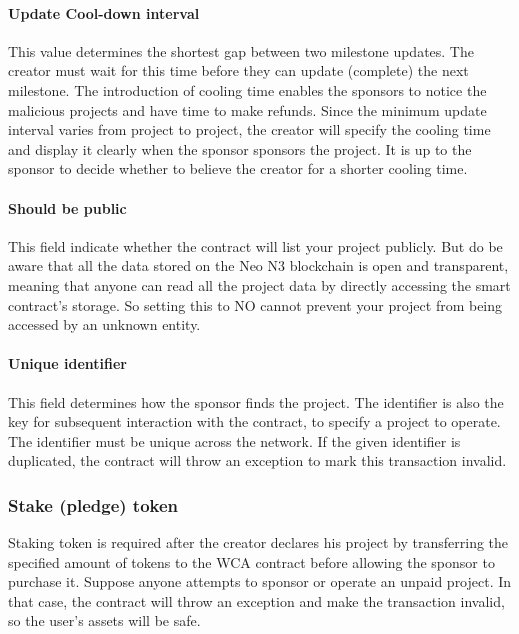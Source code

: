 \documentclass[12pt,a4paper]{article}
\begin{document}
    \paragraph{Update Cool-down interval}

    This value determines the shortest gap between two milestone updates.
    The creator must wait for this time before they can update (complete) the
    next milestone.
    The introduction of cooling time enables the sponsors to notice the malicious
    projects and have time to make refunds.
    Since the minimum update interval varies from project to project, the creator
    will specify the cooling time and display it clearly when the sponsor sponsors
    the project.
    It is up to the sponsor to decide whether to believe the creator for a shorter
    cooling time.

    \paragraph{Should be public}

    This field indicate whether the contract will list your project publicly.
    But do be aware that all the data stored on the Neo N3 blockchain is open
    and transparent, meaning that anyone can read all the project data by directly
    accessing the smart contract's storage.
    So setting this to NO cannot prevent your project from being accessed by an
    unknown entity.

    \paragraph{Unique identifier}

    This field determines how the sponsor finds the project.
    The identifier is also the key for subsequent interaction with the contract,
    to specify a project to operate.
    The identifier must be unique across the network.
    If the given identifier is duplicated, the contract will throw an exception
    to mark this transaction invalid.

    \subsubsection{Stake (pledge) token}

    Staking token is required after the creator declares his project by transferring
    the specified amount of tokens to the WCA contract before allowing the sponsor
    to purchase it.
    Suppose anyone attempts to sponsor or operate an unpaid project.
    In that case, the contract will throw an exception and make the transaction
    invalid, so the user's assets will be safe.
\end{document}
